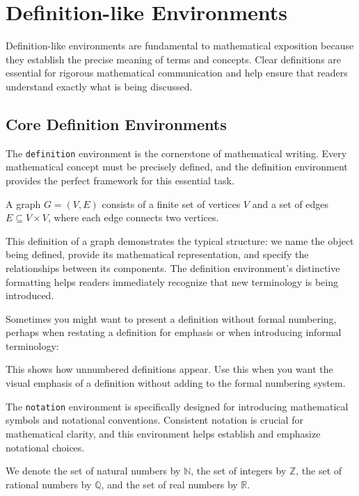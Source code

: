 \documentclass[9pt]{amsart}
\begin{document}
\section{Definition-like Environments}

Definition-like environments are fundamental to mathematical exposition because
they establish the precise meaning of terms and concepts. Clear definitions are
essential for rigorous mathematical communication and help ensure that readers
understand exactly what is being discussed.

\subsection{Core Definition Environments}

The \texttt{definition} environment is the cornerstone of mathematical writing.
Every mathematical concept must be precisely defined, and the definition
environment provides the perfect framework for this essential task.

\begin{definition}[Graph]
	A graph $G = (V, E)$ consists of a finite set of vertices $V$ and a set of edges $E \subseteq V \times V$, where each edge connects two vertices.
\end{definition}

This definition of a graph demonstrates the typical structure: we name the
object being defined, provide its mathematical representation, and specify the
relationships between its components. The definition environment's distinctive
formatting helps readers immediately recognize that new terminology is being
introduced.

Sometimes you might want to present a definition without formal numbering,
perhaps when restating a definition for emphasis or when introducing informal
terminology:

\begin{definition*}
	This shows how unnumbered definitions appear. Use this when you want the visual emphasis of a definition without adding to the formal numbering system.
\end{definition*}

The \texttt{notation} environment is specifically designed for introducing
mathematical symbols and notational conventions. Consistent notation is crucial
for mathematical clarity, and this environment helps establish and emphasize
notational choices.

\begin{notation}
	We denote the set of natural numbers by $\mathbb{N}$, the set of integers by $\mathbb{Z}$, the set of rational numbers by $\mathbb{Q}$, and the set of real numbers by $\mathbb{R}$.
\end{notation}
\end{document}
